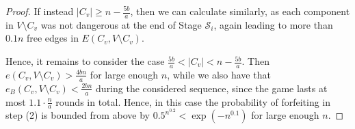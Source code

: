 \documentclass[10pt,a4paper]{amsart}
\begin{document}
\begin{proof}
If instead $|C_v|\geq n - \frac{5b}{a}$,
then we can calculate similarly,
as each component in $V\setminus C_v$ was not dangerous
at the end of Stage $\mathcal{S}_i$,
again leading to more than $0.1n$ free edges in $E(C_v,V\setminus C_v)$.

Hence, it remains to consider the case 
$\frac{5b}{a} < |C_v| < n-\frac{5b}{a}$.
Then $e(C_v,V\setminus C_v) > \frac{4bn}{a}$
for large enough $n$,
while we also have that 
$e_B(C_v,V\setminus C_v) < \frac{2bn}{a}$ during the considered sequence, since the game lasts at most $1.1\cdot \frac{n}{a}$ rounds in total. Hence, in this case
the probability of forfeiting in step (2) is bounded from above by
$0.5^{n^{0.2}} <
\exp\left( - n^{0.1}\right)$
for large enough $n$.
\end{proof}
\end{document}
